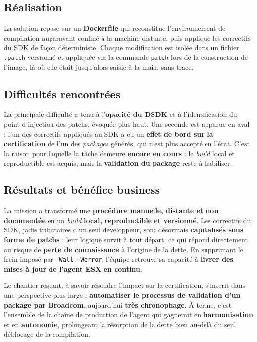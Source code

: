 \subsection{Réalisation}
La solution repose sur un \textbf{Dockerfile} qui reconstitue l'environnement de
compilation auparavant confiné à la machine distante, puis applique les
correctifs du SDK de façon déterministe. Chaque modification est isolée dans un
fichier \texttt{.patch} versionné et appliquée via la commande \texttt{patch}
lors de la construction de l'image, là où elle était jusqu'alors saisie à la
main, sans trace.

\subsection{Difficultés rencontrées}
La principale difficulté a tenu à l'\textbf{opacité du DSDK} et à
l'identification du point d'injection des patchs, évoquée plus haut. Une seconde
est apparue en aval : l'un des correctifs appliqués au SDK a eu un
\textbf{effet de bord sur la certification} de l'un des \emph{packages} générés,
qui n'est plus accepté en l'état. C'est la raison pour laquelle la tâche
demeure \textbf{encore en cours} : le \emph{build} local et reproductible est
acquis, mais la \textbf{validation du package} reste à fiabiliser.

\subsection{Résultats et bénéfice business}
La mission a transformé une \textbf{procédure manuelle, distante et non
documentée} en un \emph{build} \textbf{local, reproductible et versionné}. Les
correctifs du SDK, jadis tributaires d'un seul développeur, sont désormais
\textbf{capitalisés sous forme de patchs} : leur logique survit à tout départ,
ce qui répond directement au risque de \textbf{perte de connaissance} à l'origine
de la dette. En supprimant le frein imposé par \texttt{-Wall -Werror}, l'équipe
retrouve sa capacité à \textbf{livrer des mises à jour de l'agent ESX en
continu}.

Le chantier restant, à savoir résoudre l'impact sur la certification, s'inscrit dans
une perspective plus large : \textbf{automatiser le processus de validation d'un
package par Broadcom}, aujourd'hui \textbf{très chronophage}. À terme, c'est
l'ensemble de la chaîne de production de l'agent qui gagnerait en
\textbf{harmonisation} et en \textbf{autonomie}, prolongeant la résorption de la
dette bien au-delà du seul déblocage de la compilation.
